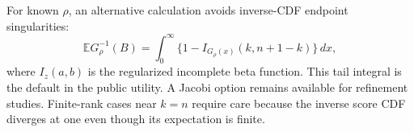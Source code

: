 \documentclass[nolineno]{ieeeaccess}
\newcommand{\E}{\mathbb{E}}
\begin{document}
For known $\rho$, an alternative calculation avoids inverse-CDF endpoint singularities:
\begin{equation}
\E G_\rho^{-1}(B)=
\int_0^\infty
\{1-I_{G_\rho(x)}(k,n+1-k)\}\,dx,
\end{equation}
where $I_z(a,b)$ is the regularized incomplete beta function. This tail integral is the default in the public utility. A Jacobi option remains available for refinement studies. Finite-rank cases near $k=n$ require care because the inverse score CDF diverges at one even though its expectation is finite.




\EOD
\vfill
\end{document}

